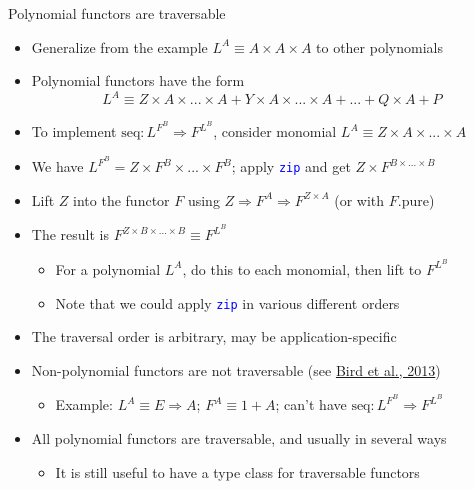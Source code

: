 \documentclass[english]{beamer}
\begin{document}
\begin{frame}{Polynomial functors are traversable}
\begin{itemize}
\item \vspace{-0.1cm}Generalize from the example $L^{A}\equiv A\times A\times A$
to other polynomials
\item Polynomial functors have the form {\small{}
\[
L^{A}\equiv Z\times A\times...\times A+Y\times A\times...\times A+...+Q\times A+P
\]
}{\small\par}
\item To implement {\small{}$\text{seq}:L^{F^{B}}\Rightarrow F^{L^{B}}$},
consider monomial {\small{}$L^{A}\equiv Z\times A\times...\times A$}{\small\par}
\item We have $L^{F^{B}}=Z\times F^{B}\times...\times F^{B}$; apply \texttt{\textcolor{blue}{\footnotesize{}zip}}
and get $Z\times F^{B\times...\times B}$ 
\item Lift $Z$ into the functor $F$ using $Z\Rightarrow F^{A}\Rightarrow F^{Z\times A}$
(or with $F.\text{pure}$)
\item The result is $F^{Z\times B\times...\times B}\equiv F^{L^{B}}$
\begin{itemize}
\item For a polynomial $L^{A}$, do this to each monomial, then lift to
$F^{L^{B}}$
\item Note that we could apply \texttt{\textcolor{blue}{\footnotesize{}zip}}
in various different orders
\end{itemize}
\item The traversal order is arbitrary, may be application-specific
\item Non-polynomial functors are not traversable (see \href{http://www.cs.ox.ac.uk/jeremy.gibbons/publications/uitbaf.pdf}{Bird et al., 2013})
\begin{itemize}
\item Example: $L^{A}\equiv E\Rightarrow A$; $F^{A}\equiv1+A$; can't have
{\small{}$\text{seq}:L^{F^{B}}\Rightarrow F^{L^{B}}$}{\small\par}
\end{itemize}
\item All polynomial functors are traversable, and usually in several ways
\begin{itemize}
\item It is still useful to have a type class for traversable functors
\end{itemize}
\end{itemize}
\end{frame}
\end{document}
